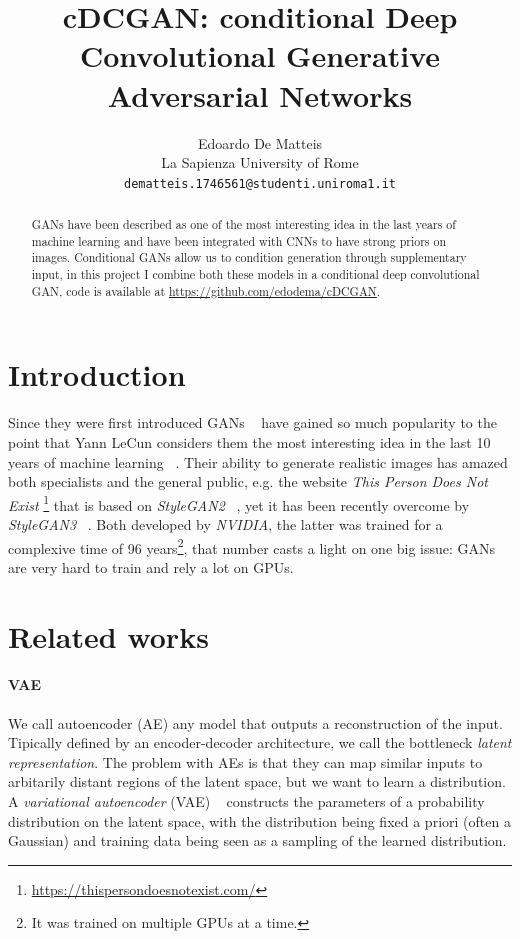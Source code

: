 \documentclass[10pt,twocolumn,letterpaper]{article}
\begin{document}
\title{cDCGAN: conditional Deep Convolutional Generative Adversarial Networks}

\author{Edoardo De Matteis\\
La Sapienza University of Rome\\
{\tt\small dematteis.1746561@studenti.uniroma1.it}
}

\maketitle

\begin{abstract}
   GANs have been described as one of the most interesting idea in the last years of machine learning and have been integrated with CNNs to have strong priors on images.
   Conditional GANs allow us to condition generation through supplementary input, in this project I combine both these models in a conditional deep convolutional GAN, code is available at \href{https://github.com/edodema/cDCGAN}{https://github.com/edodema/cDCGAN}.
\end{abstract}

\section{Introduction}
Since they were first introduced GANs ~\cite{goodfellow2014generative} have gained so much popularity to the point that Yann LeCun considers them the most interesting idea in the last 10 years of machine learning ~\cite{lecun2016riseminar}.
Their ability to generate realistic images has amazed both specialists and the general public, e.g. the website \textit{This Person Does Not Exist} \footnote{\href{https://thispersondoesnotexist.com/}{https://thispersondoesnotexist.com/}} that is based on \textit{StyleGAN2} ~\cite{viazovetskyi2020stylegan2}, yet it has been recently overcome by \textit{StyleGAN3} ~\cite{DBLP:journals/corr/abs-2106-12423}.
Both developed by \textit{NVIDIA}, the latter was trained for a complexive time of 96 years\footnote{It was trained on multiple GPUs at a time.},
that number casts a light on one big issue: GANs are very hard to train and rely a lot on GPUs.


\section{Related works}
\paragraph{VAE} We call autoencoder (AE) any model that outputs a reconstruction of the input.
Tipically defined by an encoder-decoder architecture, we call the bottleneck \textit{latent representation}.
The problem with AEs is that they can map similar inputs to arbitarily distant regions of the latent space, but we want to learn a distribution.
A \textit{variational autoencoder} (VAE) ~\cite{kingma2013auto} constructs the parameters of a probability distribution on the latent space, with the distribution being fixed a priori (often a Gaussian) and training data being seen as a sampling of the learned distribution.
\end{document}
